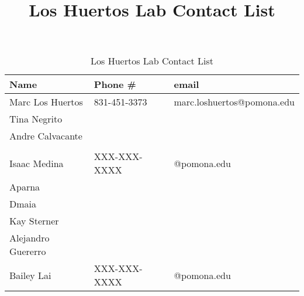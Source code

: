 \documentclass{article}
\title{Los Huertos Lab Contact List}
\begin{document}


\begin{table}[tp]
\caption{Los Huertos Lab Contact List}
\begin{tabular}{lll}\hline
Name                & Phone \#      & email   \\ \hline
Marc Los Huertos    & 831-451-3373  & marc.loshuertos@pomona.edu \\
Tina Negrito        &               & \\
Andre Calvacante    &               & \\
\\

Isaac Medina        & XXX-XXX-XXXX  & @pomona.edu \\
Aparna              &&\\
Dmaia               &&\\
Kay Sterner         &               & \\
Alejandro Guererro  &               & \\           
Bailey Lai          & XXX-XXX-XXXX  & @pomona.edu \\\hline
\end{tabular}
\end{table}
\end{document}
